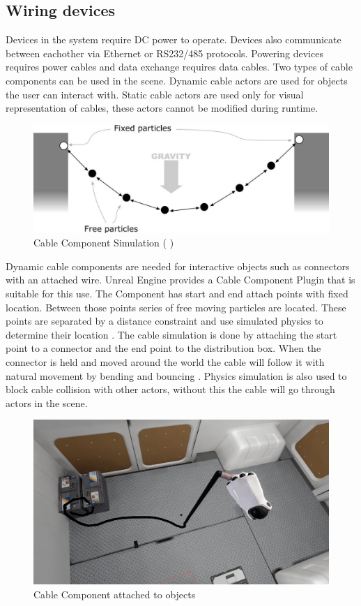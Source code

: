 \documentclass[12pt, a4paper,oneside, nocenter]{thesis}
\newcommand{\citeyeartitlexamkinline}[1]{(\usebibentry{#1}{title} \citeyear{#1})}
\begin{document}
\subsection{Wiring devices}
Devices in the system require DC power to operate. Devices also communicate between eachother via Ethernet or RS232/485 protocols. Powering devices requires power cables and data exchange requires data cables. Two types of cable components can be used in the scene. Dynamic cable actors are used for objects the user can interact with. Static cable actors are used only for visual representation of cables, these actors cannot be modified during runtime.
\begin{figure}[H]
	\includegraphics[width=\textwidth]{particle-rope}
	\caption{Cable Component Simulation \citeyeartitlexamkinline{cable-component}}
	\label{fig:particle-rope}
\end{figure}
\par
Dynamic cable components are needed for interactive objects such as connectors with an attached wire. Unreal Engine provides a Cable Component Plugin that is suitable for this use. The Component has start and end attach points with fixed location. Between those points series of free moving particles are located. These points are separated by a distance constraint and use simulated physics to determine their location . The cable simulation is done by attaching the start point to a connector and the end point to the distribution box. When the connector is held and moved around the world the cable will follow it with natural movement by bending and bouncing . Physics simulation is also used to block cable collision with other actors, without this the cable will go through actors in the scene.
\begin{figure}[H]
	\includegraphics[width=\textwidth]{cable-grab}
	\caption{Cable Component attached to objects}
	\label{fig:cable-grab}
\end{figure}
\end{document}

